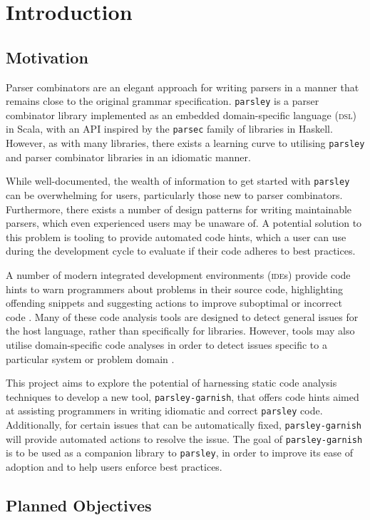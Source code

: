 \chapter{Introduction}

\section{Motivation}
Parser combinators \cite{hutton_higher-order_1992} are an elegant approach for writing parsers in a manner that remains close to the original grammar specification.
\texttt{parsley} \cite{willis_garnishing_2018} is a parser combinator library implemented as an embedded domain-specific language (\textsc{dsl}) \cite{hudak_building_1996} in Scala, with an API inspired by the \texttt{parsec} \cite{leijen_parsec_2001} family of libraries in Haskell.
However, as with many libraries, there exists a learning curve to utilising \texttt{parsley} and parser combinator libraries in an idiomatic manner.

While well-documented, the wealth of information to get started with \texttt{parsley} can be overwhelming for users, particularly those new to parser combinators.
Furthermore, there exists a number of design patterns \cite{willis_design_2022} for writing maintainable parsers, which even experienced users may be unaware of.
A potential solution to this problem is tooling to provide automated code hints, which a user can use during the development cycle to evaluate if their code adheres to best practices.


A number of modern integrated development environments (\textsc{ide}s) provide code hints to warn programmers about problems in their source code, highlighting offending snippets and suggesting actions to improve suboptimal or incorrect code \cite{kurbatova_intellij_2021}.
Many of these code analysis tools are designed to detect general issues for the host language, rather than specifically for libraries.
However, tools may also utilise domain-specific code analyses in order to detect issues specific to a particular system or problem domain \cite{renggli_domain-specific_2010,gregor_stllint_2006}.

This project aims to explore the potential of harnessing static code analysis techniques to develop a new tool, \texttt{parsley-garnish}, that offers code hints aimed at assisting programmers in writing idiomatic and correct \texttt{parsley} code.
Additionally, for certain issues that can be automatically fixed, \texttt{parsley-garnish} will provide automated actions to resolve the issue. %
The goal of \texttt{parsley-garnish} is to be used as a companion library to \texttt{parsley}, in order to improve its ease of adoption and to help users enforce best practices.

\section{Planned Objectives}
